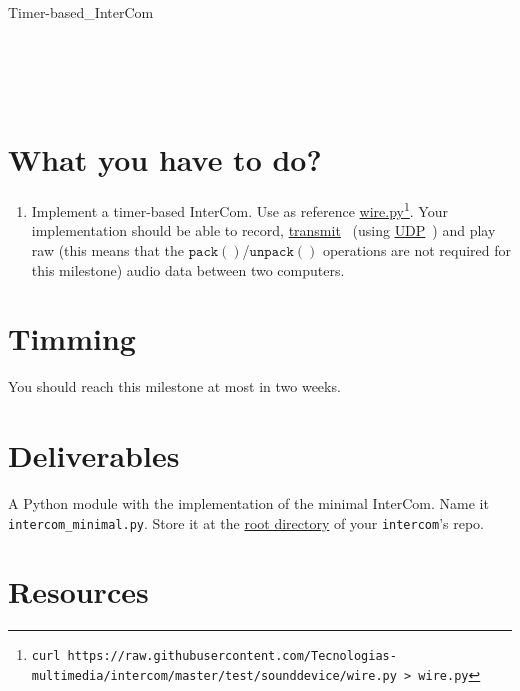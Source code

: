 \begin{pseudocode}{Timer-based\_InterCom}{~}
  \BEGIN
     \GETS {}\\
     \GETS {}\\
    \\
     \GETS {}\\
     \GETS {}\\
  \END
  \ENDPROCEDURE
\end{pseudocode}

\section{What you have to do?}

\begin{enumerate}

\item Implement a timer-based InterCom. Use as reference
  \href{https://github.com/Tecnologias-multimedia/intercom/blob/master/test/sounddevice/wire.py}{wire.py}\footnote{
  \texttt{curl
    https://raw.githubusercontent.com/Tecnologias-multimedia/intercom/master/test/sounddevice/wire.py
    > wire.py} }. Your implementation should be able to record,
  \href{https://github.com/vicente-gonzalez-ruiz/YAPT/blob/master/03-IO/networking/sockets.ipynb}{transmit}~\cite{YAPT}
  (using
  \href{https://en.wikipedia.org/wiki/User_Datagram_Protocol}{UDP}~\cite{UDP})
  and play raw (this means that the
  $\mathtt{pack()}$/$\mathtt{unpack()}$ operations are not required for
    this milestone) audio data between two computers.
  
\end{enumerate}

\section{Timming}

You should reach this milestone at most in two weeks.

\section{Deliverables}

A Python module with the implementation of the minimal InterCom. Name
it \texttt{intercom\_minimal.py}. Store it at the
\href{https://github.com/Tecnologias-multimedia/intercom}{root
  directory} of your \texttt{intercom}'s repo.

\section{Resources}


